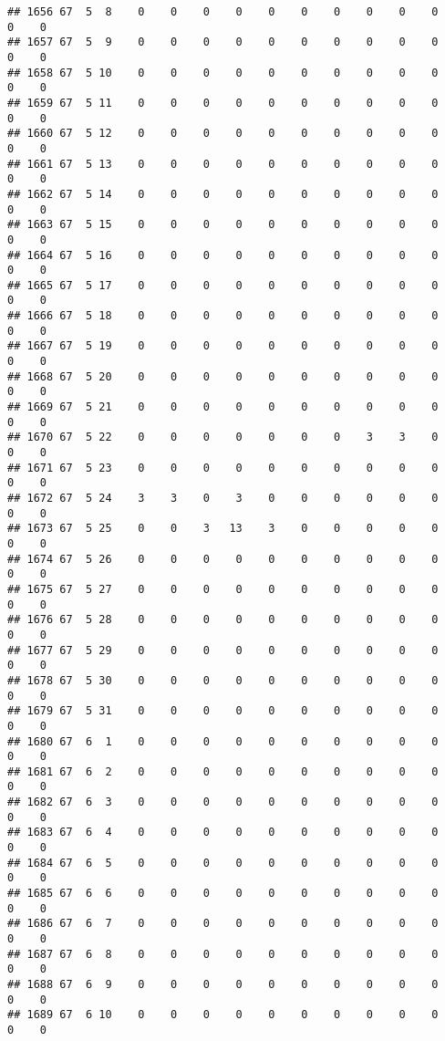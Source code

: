 \documentclass[]{article}
\begin{document}
\begin{verbatim}
## 1656 67  5  8    0    0    0    0    0    0    0    0    0    0    0    0
## 1657 67  5  9    0    0    0    0    0    0    0    0    0    0    0    0
## 1658 67  5 10    0    0    0    0    0    0    0    0    0    0    0    0
## 1659 67  5 11    0    0    0    0    0    0    0    0    0    0    0    0
## 1660 67  5 12    0    0    0    0    0    0    0    0    0    0    0    0
## 1661 67  5 13    0    0    0    0    0    0    0    0    0    0    0    0
## 1662 67  5 14    0    0    0    0    0    0    0    0    0    0    0    0
## 1663 67  5 15    0    0    0    0    0    0    0    0    0    0    0    0
## 1664 67  5 16    0    0    0    0    0    0    0    0    0    0    0    0
## 1665 67  5 17    0    0    0    0    0    0    0    0    0    0    0    0
## 1666 67  5 18    0    0    0    0    0    0    0    0    0    0    0    0
## 1667 67  5 19    0    0    0    0    0    0    0    0    0    0    0    0
## 1668 67  5 20    0    0    0    0    0    0    0    0    0    0    0    0
## 1669 67  5 21    0    0    0    0    0    0    0    0    0    0    0    0
## 1670 67  5 22    0    0    0    0    0    0    0    3    3    0    0    0
## 1671 67  5 23    0    0    0    0    0    0    0    0    0    0    0    0
## 1672 67  5 24    3    3    0    3    0    0    0    0    0    0    0    0
## 1673 67  5 25    0    0    3   13    3    0    0    0    0    0    0    0
## 1674 67  5 26    0    0    0    0    0    0    0    0    0    0    0    0
## 1675 67  5 27    0    0    0    0    0    0    0    0    0    0    0    0
## 1676 67  5 28    0    0    0    0    0    0    0    0    0    0    0    0
## 1677 67  5 29    0    0    0    0    0    0    0    0    0    0    0    0
## 1678 67  5 30    0    0    0    0    0    0    0    0    0    0    0    0
## 1679 67  5 31    0    0    0    0    0    0    0    0    0    0    0    0
## 1680 67  6  1    0    0    0    0    0    0    0    0    0    0    0    0
## 1681 67  6  2    0    0    0    0    0    0    0    0    0    0    0    0
## 1682 67  6  3    0    0    0    0    0    0    0    0    0    0    0    0
## 1683 67  6  4    0    0    0    0    0    0    0    0    0    0    0    0
## 1684 67  6  5    0    0    0    0    0    0    0    0    0    0    0    0
## 1685 67  6  6    0    0    0    0    0    0    0    0    0    0    0    0
## 1686 67  6  7    0    0    0    0    0    0    0    0    0    0    0    0
## 1687 67  6  8    0    0    0    0    0    0    0    0    0    0    0    0
## 1688 67  6  9    0    0    0    0    0    0    0    0    0    0    0    0
## 1689 67  6 10    0    0    0    0    0    0    0    0    0    0    0    0

\end{verbatim}
\end{document}
